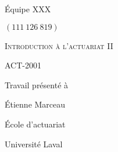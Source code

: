 

% 

\makeatletter
\begin{titlepage}
\centering \large
\begin{flushright}
Équipe XXX
\end{flushright}

\@author
\par
$(111 \ 126 \ 819)$
\vspace{0.5cm}




\vfill


{
\scshape
Introduction à l'actuariat II
\par
ACT-2001
}
\vfill


{
\bfseries \Large
\@title
}
\vfill


Travail présenté à
\par
Étienne Marceau
\vfill

École d'actuariat
\par
Université Laval
\par 
\@date
\end{titlepage}
\makeatother
